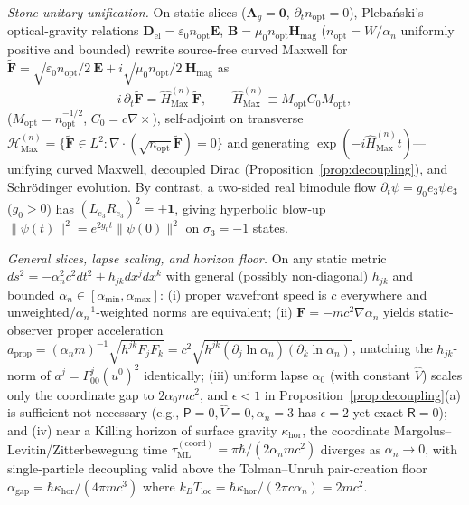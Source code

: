 \documentclass[aps,prl,reprint,superscriptaddress,nofootinbib,floatfix]{revtex4-2}
\theoremstyle{prlthm}
\begin{document}
\emph{Stone unitary unification.} On static slices ($\mathbf{A}_g=\mathbf{0}$, $\partial_t n_\text{opt}=0$), Pleba\'nski's optical-gravity relations $\mathbf{D}_\text{el}=\varepsilon_0n_\text{opt}\mathbf{E}$, $\mathbf{B}=\mu_0n_\text{opt}\mathbf{H}_\text{mag}$ ($n_\text{opt}=W/\alpha_n$ uniformly positive and bounded) rewrite source-free curved Maxwell for $\tilde{\mathbf{F}}=\sqrt{\varepsilon_0n_\text{opt}/2}\,\mathbf{E}+i\sqrt{\mu_0n_\text{opt}/2}\,\mathbf{H}_\text{mag}$ as
\begin{equation}
  i\,\partial_t\tilde{\mathbf{F}}=\hat{H}_\text{Max}^{(n)}\tilde{\mathbf{F}},\qquad \hat{H}_\text{Max}^{(n)}\equiv M_\text{opt}C_0M_\text{opt},
  \label{eq:optical_maxwell}
\end{equation}
($M_\text{opt}=n_\text{opt}^{-1/2}$, $C_0=c\nabla\times$), self-adjoint on transverse $\mathcal{H}_\text{Max}^{(n)}=\{\tilde{\mathbf{F}}\in L^2:\nabla\cdot(\sqrt{n_\text{opt}}\tilde{\mathbf{F}})=0\}$ and generating $\exp(-i\hat{H}_\text{Max}^{(n)}t)$---unifying curved Maxwell, decoupled Dirac (Proposition~\ref{prop:decoupling}), and Schr\"odinger evolution. By contrast, a two-sided real bimodule flow $\partial_t\psi=g_0e_3\psi e_3$ ($g_0>0$) has $(L_{e_3}R_{e_3})^2=+\mathbf{1}$, giving hyperbolic blow-up $\|\psi(t)\|^2=e^{2g_0t}\|\psi(0)\|^2$ on $\sigma_3=-1$ states.

\emph{General slices, lapse scaling, and horizon floor.} On any static metric $ds^2=-\alpha_n^2c^2dt^2+h_{jk}dx^jdx^k$ with general (possibly non-diagonal) $h_{jk}$ and bounded $\alpha_n\in[\alpha_{\min},\alpha_{\max}]$: (i) proper wavefront speed is $c$ everywhere and unweighted/$\alpha_n^{-1}$-weighted norms are equivalent; (ii) $\mathbf{F}=-mc^2\nabla\alpha_n$ yields static-observer proper acceleration $a_\text{prop}=(\alpha_n m)^{-1}\sqrt{h^{jk}F_jF_k}=c^2\sqrt{h^{jk}(\partial_j\ln\alpha_n)(\partial_k\ln\alpha_n)}$, matching the $h_{jk}$-norm of $a^j=\Gamma^j_{00}(u^0)^2$ identically; (iii) uniform lapse $\alpha_0$ (with constant $\hat{V}$) scales only the coordinate gap to $2\alpha_0mc^2$, and $\epsilon<1$ in Proposition~\ref{prop:decoupling}(a) is sufficient not necessary (e.g., $\mathsf{P}=0,\hat{V}=0,\alpha_n=3$ has $\epsilon=2$ yet exact $\mathsf{R}=0$); and (iv) near a Killing horizon of surface gravity $\kappa_\text{hor}$, the coordinate Margolus--Levitin/Zitterbewegung time $\tau_\text{ML}^{(\text{coord})}=\pi\hbar/(2\alpha_n mc^2)$ diverges as $\alpha_n\to 0$, with single-particle decoupling valid above the Tolman--Unruh pair-creation floor $\alpha_\text{gap}=\hbar\kappa_\text{hor}/(4\pi mc^3)$ where $k_BT_\text{loc}=\hbar\kappa_\text{hor}/(2\pi c\alpha_n)=2mc^2$.
\end{document}
